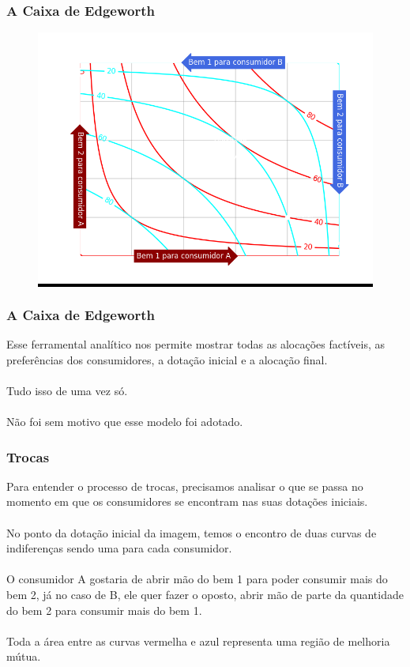 \documentclass{beamer}[10]
\begin{document}
\begin{frame}
	\frametitle{A Caixa de Edgeworth}

	\begin{figure}[H]
		\centering
		\colorbox{black}{\includegraphics[scale=0.6]{cap32_1-caixa_edgeworth_2.png}}
	\end{figure}

\end{frame}

\begin{frame}
	\frametitle{A Caixa de Edgeworth}

	Esse ferramental analítico nos permite mostrar todas as alocações factíveis, as preferências dos consumidores, a dotação inicial e a alocação final. 
	\\~\\
	Tudo isso de uma vez só. 
	\\~\\
	Não foi sem motivo que esse modelo foi adotado.

\end{frame}

\begin{frame}
	\frametitle{Trocas}

	Para entender o processo de trocas, precisamos analisar o que se passa no momento em que os consumidores se encontram nas suas dotações iniciais.
	\\~\\
	No ponto da dotação inicial da imagem, temos o encontro de duas curvas de indiferenças sendo uma para cada consumidor.
	\\~\\
	O consumidor A gostaria de abrir mão do bem 1 para poder consumir mais do bem 2, já no caso de B, ele quer fazer o oposto, abrir mão de parte da quantidade do bem 2 para consumir mais do bem 1. 
	\\~\\
	Toda a área entre as curvas vermelha e azul representa uma região de melhoria mútua.

\end{frame}
\end{document}
